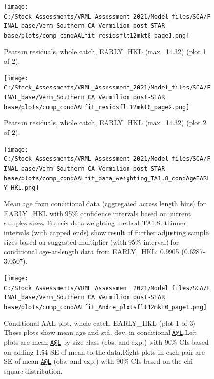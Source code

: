 \documentclass[11pt,
  english,
]{article}
\begin{document}
\begin{figure}
\centering
\texttt{[image: C:/Stock\_Assessments/VRML\_Assessment\_2021/Model\_files/SCA/FINAL\_base/Verm\_Southern CA Vermilion post-STAR base/plots/comp\_condAALfit\_residsflt12mkt0\_page1.png]}
\caption{Pearson residuals, whole catch, EARLY\_HKL (max=14.32) (plot 1 of 2).\label{fig:comp_condAALfit_residsflt12mkt0_page1}}
\end{figure}

\begin{figure}
\centering
\texttt{[image: C:/Stock\_Assessments/VRML\_Assessment\_2021/Model\_files/SCA/FINAL\_base/Verm\_Southern CA Vermilion post-STAR base/plots/comp\_condAALfit\_residsflt12mkt0\_page2.png]}
\caption{Pearson residuals, whole catch, EARLY\_HKL (max=14.32) (plot 2 of 2).\label{fig:comp_condAALfit_residsflt12mkt0_page2}}
\end{figure}

\begin{figure}
\centering
\texttt{[image: C:/Stock\_Assessments/VRML\_Assessment\_2021/Model\_files/SCA/FINAL\_base/Verm\_Southern CA Vermilion post-STAR base/plots/comp\_condAALfit\_data\_weighting\_TA1.8\_condAgeEARLY\_HKL.png]}
\caption{Mean age from conditional data (aggregated across length bins) for EARLY\_HKL with 95\% confidence intervals based on current samples sizes. Francis data weighting method TA1.8: thinner intervals (with capped ends) show result of further adjusting sample sizes based on suggested multiplier (with 95\% interval) for conditional age-at-length data from EARLY\_HKL: 0.9905 (0.6287-3.0507).\label{fig:comp_condAALfit_data_weighting_TA1.8_condAgeEARLY_HKL}}
\end{figure}

\begin{figure}
\centering
\texttt{[image: C:/Stock\_Assessments/VRML\_Assessment\_2021/Model\_files/SCA/FINAL\_base/Verm\_Southern CA Vermilion post-STAR base/plots/comp\_condAALfit\_Andre\_plotsflt12mkt0\_page1.png]}
\caption{Conditional AAL plot, whole catch, EARLY\_HKL (plot 1 of 3) These plots show mean age and std. dev. in conditional {\href{mailto:A@L}{\nolinkurl{A@L}}\leavevmode\tagmcend\tagstructend}.Left plots are mean {\href{mailto:A@L}{\nolinkurl{A@L}}\leavevmode\tagmcend\tagstructend} by size-class (obs. and exp.) with 90\% CIs based on adding 1.64 SE of mean to the data.Right plots in each pair are SE of mean {\href{mailto:A@L}{\nolinkurl{A@L}}\leavevmode\tagmcend\tagstructend} (obs. and exp.) with 90\% CIs based on the chi-square distribution.\label{fig:comp_condAALfit_Andre_plotsflt12mkt0_page1}}
\end{figure}
\end{document}
